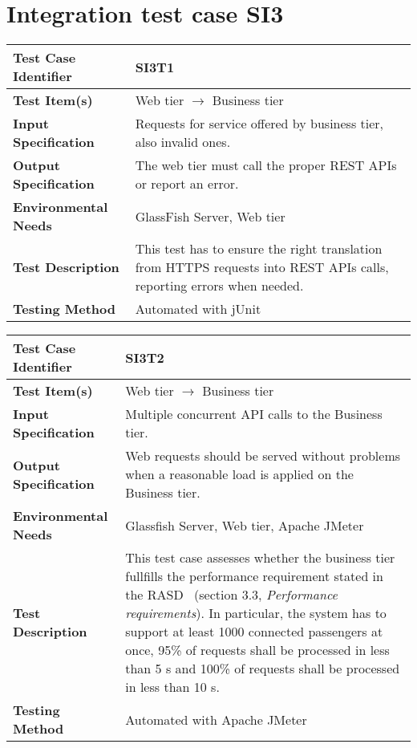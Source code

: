 \vspace{2em}

\section{Integration test case SI3}

\begin{tabular}{l p{}}
    \hline
    \textbf{Test Case Identifier} & SI3T1\\
    \hline
    \textbf{Test Item(s)} & Web tier $\rightarrow$ Business tier\\
    \hline
    \textbf{Input Specification} & Requests for service offered by business tier, also invalid ones.\\
    \hline
    \textbf{Output Specification} & The web tier must call the proper REST APIs or report an error. \\
    \hline
    \textbf{Environmental Needs} & GlassFish Server, Web tier\\
    \hline
    \textbf{Test Description} & This test has to ensure the right translation from HTTPS requests into REST APIs calls, reporting errors when needed.\\
    \hline
    \textbf{Testing Method} & Automated with jUnit \\
    \hline
\end{tabular}

\vspace{2em}

\noindent\begin{tabular}{l p{}}
    \hline
    \textbf{Test Case Identifier} & SI3T2\\
    \hline
    \textbf{Test Item(s)} & Web tier $\rightarrow$ Business tier\\
    \hline
    \textbf{Input Specification} & Multiple concurrent API calls to the Business tier.\\
    \hline
    \textbf{Output Specification} & Web requests should be served without problems when a reasonable load is applied on the Business tier. \\
    \hline
    \textbf{Environmental Needs} & Glassfish Server, Web tier, Apache JMeter\\
    \hline
    \textbf{Test Description} & This test case assesses whether the business tier fullfills the performance requirement stated in the RASD~\cite{mytaxi-rasd} (section 3.3, \emph{Performance requirements}). In particular, the system has to support at least 1000 connected passengers at once, 95\% of requests shall be processed in less than 5 s and 100\% of requests shall be processed in less than 10 s.\\
    \hline
    \textbf{Testing Method} & Automated with Apache JMeter \\
    \hline
\end{tabular}

